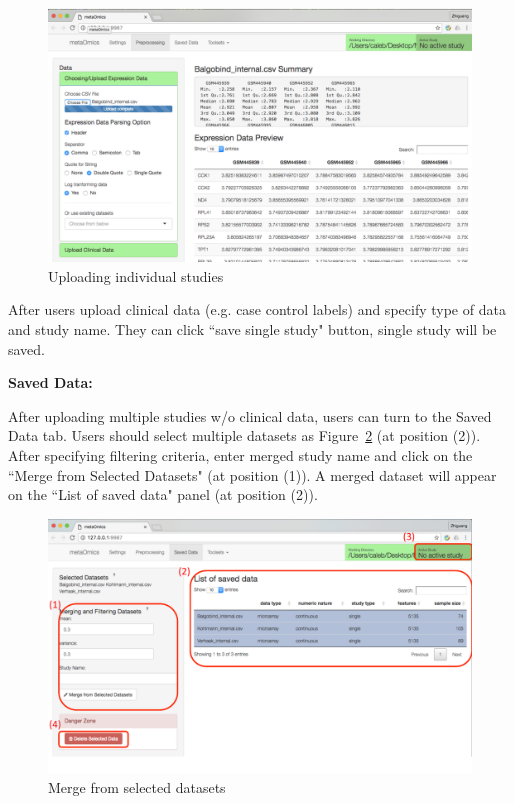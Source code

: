 \begin{steps}
\begin{figure}[H]
\begin{center}
\includegraphics[scale=0.4]{./figure/preprocessing/GUIpreview}
\caption{Uploading individual studies}
\label{fig:GUIpreview}
\end{center}
\end{figure}
After users upload clinical data (e.g. case control labels) and specify type of data and study name.
They can click ``save single study" button, single study will be saved.

\item \textbf{Saved Data:}

After uploading multiple studies w/o clinical data,
users can turn to the Saved Data tab.
Users should select multiple datasets as Figure~\ref{fig:GUImerge} (at position {\color{red} (2)}).
After specifying filtering criteria, enter merged study name and click on the ``Merge from Selected Datasets" (at position {\color{red} (1)}).
A merged dataset will appear on the  ``List of saved data" panel (at position {\color{red} (2)}).

\begin{figure}[H]
\begin{center}
\includegraphics[scale=0.4]{./figure/preprocessing/GUImerge}
\caption{Merge from selected datasets}
\label{fig:GUImerge}
\end{center}
\end{figure}


\end{steps}
